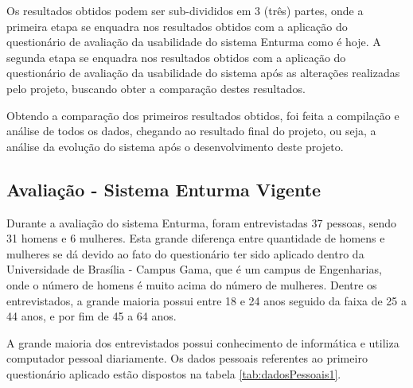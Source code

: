 
Os resultados obtidos podem ser sub-divididos em 3 (três) partes, onde a primeira etapa se enquadra nos resultados obtidos com a aplicação do questionário de avaliação da usabilidade do sistema Enturma como é hoje. A segunda etapa se enquadra nos resultados obtidos com a aplicação do questionário de avaliação da usabilidade do sistema após as alterações realizadas pelo projeto, buscando obter a comparação destes resultados.

Obtendo a comparação dos primeiros resultados obtidos, foi feita a compilação e análise de todos os dados, chegando ao resultado final do projeto, ou seja, a análise da evolução do sistema após o desenvolvimento deste projeto. 

\subsection{Avaliação - Sistema Enturma Vigente} %
\label{sub:avalia_o_sistema_enturma_atual}

Durante a avaliação do sistema Enturma, foram entrevistadas 37 pessoas, sendo 31 homens e 6 mulheres. Esta grande diferença entre quantidade de homens e mulheres se dá devido ao fato do questionário ter sido aplicado dentro da Universidade de Brasília - Campus Gama, que é um campus de Engenharias, onde o número de homens é muito acima do número de mulheres. Dentre os entrevistados, a grande maioria possui entre 18 e 24 anos seguido da faixa de 25 a 44 anos, e por fim de 45 a 64 anos.

A grande maioria dos entrevistados possui conhecimento de informática e utiliza computador pessoal diariamente. Os dados pessoais referentes ao primeiro questionário aplicado estão dispostos na tabela \ref{tab:dadosPessoais1}.

